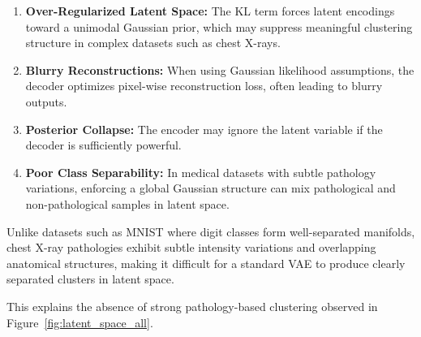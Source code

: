 \begin{enumerate}
    \item \textbf{Over-Regularized Latent Space:}  
    The KL term forces latent encodings toward a unimodal Gaussian prior, which may suppress meaningful clustering structure in complex datasets such as chest X-rays.

    \item \textbf{Blurry Reconstructions:}  
    When using Gaussian likelihood assumptions, the decoder optimizes pixel-wise reconstruction loss, often leading to blurry outputs.

    \item \textbf{Posterior Collapse:}  
    The encoder may ignore the latent variable if the decoder is sufficiently powerful.

    \item \textbf{Poor Class Separability:}  
    In medical datasets with subtle pathology variations, enforcing a global Gaussian structure can mix pathological and non-pathological samples in latent space.
\end{enumerate}

Unlike datasets such as MNIST where digit classes form well-separated manifolds, chest X-ray pathologies exhibit subtle intensity variations and overlapping anatomical structures, making it difficult for a standard VAE to produce clearly separated clusters in latent space.

This explains the absence of strong pathology-based clustering observed in Figure~\ref{fig:latent_space_all}.
